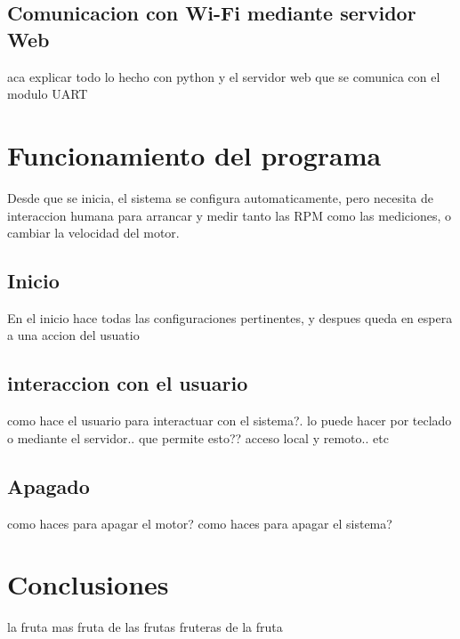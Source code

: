 \documentclass[a4paper]{article}
\begin{document}
\subsection{Comunicacion con Wi-Fi mediante servidor Web} %
\label{sub:comunicacion_con_wi_fi_mediante_servidor_web}

aca explicar todo lo hecho con python y el servidor web que se comunica con el modulo UART


\section{Funcionamiento del programa} %
\label{sec:funcionamiento_del_programa}

Desde que se inicia, el sistema se configura automaticamente, pero necesita de interaccion humana para arrancar y medir tanto las RPM como las mediciones, o cambiar la velocidad del motor.

\subsection{Inicio} %
\label{sub:inicio}

En el inicio hace todas las configuraciones pertinentes, y despues queda en espera a una accion del usuatio


\subsection{interaccion con el usuario} %
\label{sub:interaccion_con_el_usuario}

como hace el usuario para interactuar con el sistema?. lo puede hacer por teclado o mediante el servidor.. que permite esto?? acceso local y remoto.. etc


\subsection{Apagado} %
\label{sub:apagado}

como haces para apagar el motor? como haces para apagar el sistema?




\section{Conclusiones} %
\label{sec:conclusiones}

la fruta mas fruta de las frutas fruteras de la fruta









 
\end{document}
